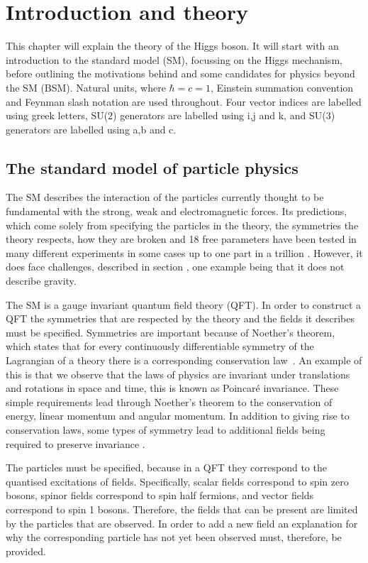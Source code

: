 \chapter{Introduction and theory}
\label{chap:theory}
This chapter will explain the theory of the Higgs boson. It will start with an introduction to the standard model (SM), focussing on the Higgs mechanism, before outlining the motivations behind and some candidates for physics beyond the SM (BSM). Natural units, where $\hbar=c=1$, Einstein summation convention and Feynman slash notation are used throughout. Four vector indices are labelled using greek letters, SU(2) generators are labelled using i,j and k, and SU(3) generators are labelled using a,b and c.

\section{The standard model of particle physics}
\label{sec:SM}
The SM describes the interaction of the particles currently thought to be fundamental with the strong, weak and electromagnetic forces. Its predictions, which come solely from specifying the particles in the theory, the symmetries the theory respects, how they are broken and 18 free parameters have been tested in many different experiments in some cases up to one part in a trillion \cite{PhysRevLett.100.120801}. However, it does face challenges, described in section , one example being that it does not describe gravity. 

The SM is a gauge invariant quantum field theory (QFT). In order to construct a QFT the symmetries that are respected by the theory and the fields it describes must be specified. Symmetries are important because of Noether's theorem, which states that for every continuously differentiable symmetry of the Lagrangian of a theory there is a corresponding conservation law~\cite{Noether:1918zz,doi:10.1080/00411457108231446}. An example of this is that we observe that the laws of physics are invariant under translations and rotations in space and time, this is known as Poincar\'e invariance. These simple requirements lead through Noether's theorem to the conservation of energy, linear momentum and angular momentum. In addition to giving rise to conservation laws, some types of symmetry lead to additional fields being required to preserve invariance \cite{PhysRev.96.191}.

The particles must be specified, because in a QFT they correspond to the quantised excitations of fields. Specifically, scalar fields correspond to spin zero bosons, spinor fields correspond to spin half fermions, and vector fields correspond to spin 1 bosons. Therefore, the fields that can be present are limited by the particles that are observed. In order to add a new field an explanation for why the corresponding particle has not yet been observed must, therefore, be provided. 

